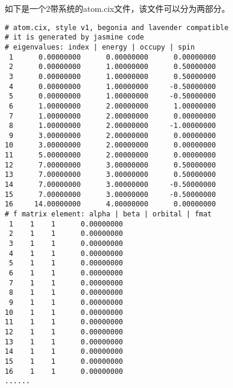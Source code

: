 如下是一个2带系统的atom.cix文件，该文件可以分为两部分。

\begin{lstlisting}[frame=single]
# atom.cix, style v1, begonia and lavender compatible
# it is generated by jasmine code
# eigenvalues: index | energy | occupy | spin
 1      0.00000000      0.00000000      0.00000000
 2      0.00000000      1.00000000      0.50000000
 3      0.00000000      1.00000000      0.50000000
 4      0.00000000      1.00000000     -0.50000000
 5      0.00000000      1.00000000     -0.50000000
 6      1.00000000      2.00000000      1.00000000
 7      1.00000000      2.00000000      0.00000000
 8      1.00000000      2.00000000     -1.00000000
 9      3.00000000      2.00000000      0.00000000
10      3.00000000      2.00000000      0.00000000
11      5.00000000      2.00000000      0.00000000
12      7.00000000      3.00000000      0.50000000
13      7.00000000      3.00000000      0.50000000
14      7.00000000      3.00000000     -0.50000000
15      7.00000000      3.00000000     -0.50000000
16     14.00000000      4.00000000      0.00000000
# f matrix element: alpha | beta | orbital | fmat
 1    1    1      0.00000000
 2    1    1      0.00000000
 3    1    1      0.00000000
 4    1    1      0.00000000
 5    1    1      0.00000000
 6    1    1      0.00000000
 7    1    1      0.00000000
 8    1    1      0.00000000
 9    1    1      0.00000000
10    1    1      0.00000000
11    1    1      0.00000000
12    1    1      0.00000000
13    1    1      0.00000000
14    1    1      0.00000000
15    1    1      0.00000000
16    1    1      0.00000000
......
\end{lstlisting}

